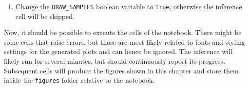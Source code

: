 \begin{tcolorbox}[title=\faIcon{recycle} Reproducibility, parbox=false]
\begin{enumerate}
        \item Change the \verb|DRAW_SAMPLES| boolean variable to \texttt{True}, otherwise the inference cell will be skipped.
    \end{enumerate}

    Now, it should be possible to execute the cells of the notebook. There might be some cells that raise errors, but those are most likely related to fonts and styling settings for the generated plots and can hence be ignored. The inference will likely run for several minutes, but should continuously report its progress. Subsequent cells will produce the figures shown in this chapter and store them inside the  \texttt{figures} folder relative to the notebook.
\end{tcolorbox}
